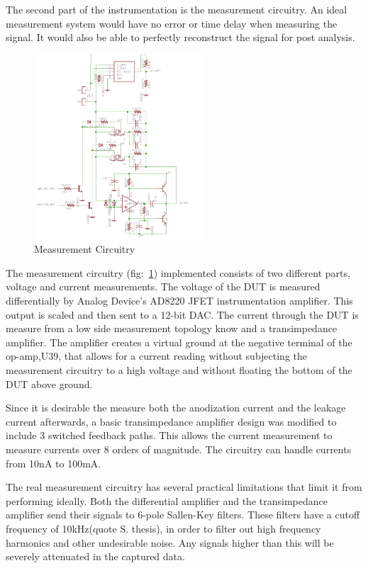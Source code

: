\documentclass[journal]{IEEEtran}
\begin{document}
The second part of the instrumentation is the measurement circuitry. An ideal measurement system would have no error or time delay when measuring the signal. It would also be able to perfectly reconstruct the signal for post analysis. 
 

\begin{figure}[here]
\centering
\includegraphics[width=2.5in]{measCir}
\caption{Measurement Circuitry}
\label{fig:measCir}
\end{figure}

The measurement circuitry (fig:~\ref{fig:measCir}) implemented consists of two different parts, voltage and current measurements. The voltage of the DUT is measured differentially by Analog Device’s AD8220 JFET instrumentation amplifier. This output is scaled and then sent to a 12-bit DAC. The current through the DUT is measure from a low side measurement topology know and a transimpedance amplifier. The amplifier creates a virtual ground at the negative terminal of the op-amp,U39, that allows for a current reading without subjecting the measurement circuitry to a high voltage and without floating the bottom of the DUT above ground.

Since it is desirable the measure both the anodization current and the leakage current afterwards, a basic transimpedance amplifier design was modified to include 3 switched feedback paths. This allows the current measurement to measure currents over 8 orders of magnitude. The circuitry can handle currents from 10nA to 100mA.

The real measurement circuitry has several practical limitations that limit it from performing ideally. Both the differential amplifier and the transimpedance amplifier send their signals to 6-pole Sallen-Key filters. These filters have a cutoff frequency of 10kHz(quote S. thesis), in order to filter out high frequency harmonics and other undesirable noise. Any signals higher than this will be severely attenuated in the captured data.
\end{document}
